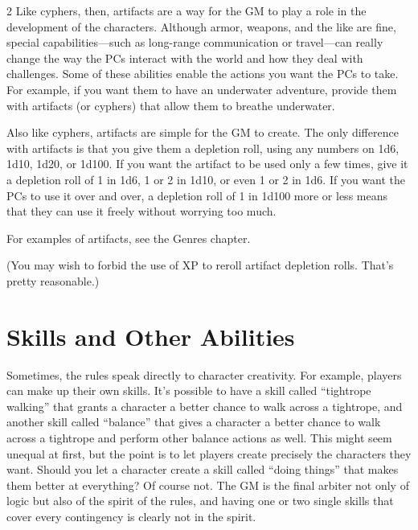 \begin{multicols}{2}
Like cyphers, then, artifacts are a way for the GM to play a role in the development of the characters. Although armor, weapons, and the like are fine, special capabilities—such as long-range communication or travel—can really change the way the PCs interact with the world and how they deal with challenges. Some of these abilities enable the actions you want the PCs to take. For example, if you want them to have an underwater adventure, provide them with artifacts (or cyphers) that allow them to breathe underwater.

Also like cyphers, artifacts are simple for the GM to create. The only difference with artifacts is that you give them a depletion roll, using any numbers on 1d6, 1d10, 1d20, or 1d100. If you want the artifact to be used only a few times, give it a depletion roll of 1 in 1d6, 1 or 2 in 1d10, or even 1 or 2 in 1d6. If you want the PCs to use it over and over, a depletion roll of 1 in 1d100 more or less means that they can use it freely without worrying too much.

For examples of artifacts, see the Genres chapter.

(You may wish to forbid the use of XP to reroll artifact depletion rolls. That’s pretty reasonable.)

\chapter{Skills and Other Abilities}

Sometimes, the rules speak directly to character creativity. For example, players can make up their own skills. It’s possible to have a skill called “tightrope walking” that grants a character a better chance to walk across a tightrope, and another skill called “balance” that gives a character a better chance to walk across a tightrope and perform other balance actions as well. This might seem unequal at first, but the point is to let players create precisely the characters they want. Should you let a character create a skill called “doing things” that makes them better at everything? Of course not. The GM is the final arbiter not only of logic but also of the spirit of the rules, and having one or two single skills that cover every contingency is clearly not in the spirit.


\end{multicols}
